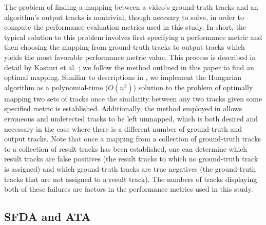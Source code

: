 \documentclass{article}
\begin{document}
The problem of finding a mapping between a video's ground-truth tracks and an algorithm's output tracks is nontrivial, though necesary to solve, in order to compute the performance evaluation metrics used in this study. In short, the typical solution to this problem involves first specifying a performance metric and then choosing the mapping from ground-truth tracks to output tracks which yields the most favorable performance metric value. This process is described in detail by Kasturi et al. \cite{kasturi_2008}; we follow the method outlined in this paper to find an optimal mapping. Similiar to descriptions in \cite{kasturi_2008}, we implement the Hungarian algorithm \cite{munkres_1957} as a polynomial-time ($O(n^{3})$) solution to the problem of optimally mapping two sets of tracks once the similarity between any two tracks given some specified metric is established. Additionally, the method employed in \cite{kasturi_2008} allows erroneous and undetected tracks to be left unmapped, which is both desired and necessary in the case where there is a different number of ground-truth and output tracks. Note that once a mapping from a collection of ground-truth tracks to a collection of result tracks has been established, one can determine which result tracks are false positives (the result tracks to which no ground-truth track is assigned) and which ground-truth tracks are true negatives (the ground-truth tracks that are not assigned to a result track). The numbers of tracks displaying both of these failures are factors in the performance metrics used in this study.


\subsection{SFDA and ATA}
\end{document}
